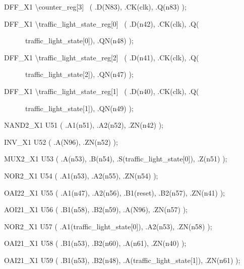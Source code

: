 \documentclass[a4paper]{article}
\begin{document}
\begin{center}
\begin{minipage}{6.04653in}
{\ttfamily\color[rgb]{0.0,0.0,0.039215688}
\ \ DFF\_X1 {\textbackslash}counter\_reg[3] \ ( .D(N83), .CK(clk),
.Q(n83) );}

{\ttfamily\color[rgb]{0.0,0.0,0.039215688}
\ \ DFF\_X1 {\textbackslash}traffic\_light\_state\_reg[0] \ ( .D(n42),
.CK(clk), .Q(}

{\ttfamily\color[rgb]{0.0,0.0,0.039215688}
\ \ \ \ \ \ \ \ traffic\_light\_state[0]), .QN(n48) );}

{\ttfamily\color[rgb]{0.0,0.0,0.039215688}
\ \ DFF\_X1 {\textbackslash}traffic\_light\_state\_reg[2] \ ( .D(n41),
.CK(clk), .Q(}

{\ttfamily\color[rgb]{0.0,0.0,0.039215688}
\ \ \ \ \ \ \ \ traffic\_light\_state[2]), .QN(n47) );}

{\ttfamily\color[rgb]{0.0,0.0,0.039215688}
\ \ DFF\_X1 {\textbackslash}traffic\_light\_state\_reg[1] \ ( .D(n40),
.CK(clk), .Q(}

{\ttfamily\color[rgb]{0.0,0.0,0.039215688}
\ \ \ \ \ \ \ \ traffic\_light\_state[1]), .QN(n49) );}

{\ttfamily\color[rgb]{0.0,0.0,0.039215688}
\ \ NAND2\_X1 U51 ( .A1(n51), .A2(n52), .ZN(n42) );\ }

{\ttfamily\color[rgb]{0.0,0.0,0.039215688}
\ \ INV\_X1 U52 ( .A(N96), .ZN(n52) );}

{\ttfamily\color[rgb]{0.0,0.0,0.039215688}
\ \ MUX2\_X1 U53 ( .A(n53), .B(n54), .S(traffic\_light\_state[0]),
.Z(n51) );}

{\ttfamily\color[rgb]{0.0,0.0,0.039215688}
\ \ NOR2\_X1 U54 ( .A1(n53), .A2(n55), .ZN(n54) );}

{\ttfamily\color[rgb]{0.0,0.0,0.039215688}
\ \ OAI22\_X1 U55 ( .A1(n47), .A2(n56), .B1(reset), .B2(n57), .ZN(n41)
);}

{\ttfamily\color[rgb]{0.0,0.0,0.039215688}
\ \ AOI21\_X1 U56 ( .B1(n58), .B2(n59), .A(N96), .ZN(n57) );}

{\ttfamily\color[rgb]{0.0,0.0,0.039215688}
\ \ NOR2\_X1 U57 ( .A1(traffic\_light\_state[0]), .A2(n53), .ZN(n58) );}

{\ttfamily\color[rgb]{0.0,0.0,0.039215688}
\ \ OAI21\_X1 U58 ( .B1(n53), .B2(n60), .A(n61), .ZN(n40) );}

{\ttfamily\color[rgb]{0.0,0.0,0.039215688}
\ \ OAI21\_X1 U59 ( .B1(n53), .B2(n48), .A(traffic\_light\_state[1]),
.ZN(n61) );}


\bigskip


\bigskip
\end{minipage}
\end{center}
\end{document}
